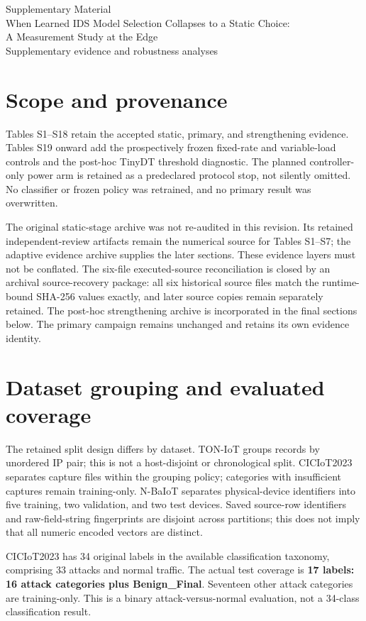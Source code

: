 \documentclass[10pt,a4paper]{article}
\begin{document}
\begin{center}
{\LARGE Supplementary Material}\\[6pt]
{\large When Learned IDS Model Selection Collapses to a Static Choice:}\\[2pt]
{\large A Measurement Study at the Edge}\\[4pt]
Supplementary evidence and robustness analyses
\end{center}

\section{Scope and provenance}
Tables S1--S18 retain the accepted static, primary, and strengthening evidence. Tables S19 onward add the prospectively frozen fixed-rate and variable-load controls and the post-hoc TinyDT threshold diagnostic. The planned controller-only power arm is retained as a predeclared protocol stop, not silently omitted. No classifier or frozen policy was retrained, and no primary result was overwritten.

The original static-stage archive was not re-audited in this revision. Its retained independent-review artifacts remain the numerical source for Tables S1--S7; the adaptive evidence archive supplies the later sections. These evidence layers must not be conflated. The six-file executed-source reconciliation is closed by an archival source-recovery package: all six historical source files match the runtime-bound SHA-256 values exactly, and later source copies remain separately retained. The post-hoc strengthening archive is incorporated in the final sections below. The primary campaign remains unchanged and retains its own evidence identity.

\section{Dataset grouping and evaluated coverage}
The retained split design differs by dataset. TON-IoT groups records by unordered IP pair; this is not a host-disjoint or chronological split. CICIoT2023 separates capture files within the grouping policy; categories with insufficient captures remain training-only. N-BaIoT separates physical-device identifiers into five training, two validation, and two test devices. Saved source-row identifiers and raw-field-string fingerprints are disjoint across partitions; this does not imply that all numeric encoded vectors are distinct.

CICIoT2023 has 34 original labels in the available classification taxonomy, comprising 33 attacks and normal traffic. The actual test coverage is \textbf{17 labels: 16 attack categories plus Benign\_Final}. Seventeen other attack categories are training-only. This is a binary attack-versus-normal evaluation, not a 34-class classification result.
\end{document}
